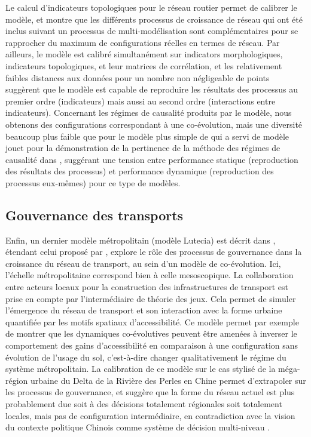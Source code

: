 \documentclass[11pt]{article}
\begin{document}
Le calcul d'indicateurs topologiques pour le réseau routier permet de calibrer le modèle, et \cite{raimbault2018multi} montre que les différents processus de croissance de réseau qui ont été inclus suivant un processus de multi-modélisation sont complémentaires pour se rapprocher du maximum de configurations réelles en termes de réseau. Par ailleurs, le modèle est calibré simultanément sur indicators morphologiques, indicateurs topologiques, et leur matrices de corrélation, et les relativement faibles distances aux données pour un nombre non négligeable de points suggèrent que le modèle est capable de reproduire les résultats des processus au premier ordre (indicateurs) mais aussi au second ordre (interactions entre indicateurs). Concernant les régimes de causalité produits par le modèle, nous obtenons des configurations correspondant à une co-évolution, mais une diversité beaucoup plus faible que pour le modèle plus simple de \cite{raimbault2014hybrid} qui a servi de modèle jouet pour la démonstration de la pertinence de la méthode des régimes de causalité dans \cite{raimbault2017identification}, suggérant une tension entre performance statique (reproduction des résultats des processus) et performance dynamique (reproduction des processus eux-mêmes) pour ce type de modèles.
 

\subsection{Gouvernance des transports}
 
Enfin, un dernier modèle métropolitain (modèle Lutecia) est décrit dans \cite{raimbault2018caracterisation}, étendant celui proposé par \citep{lenechet:halshs-01272236}, explore le rôle des processus de gouvernance dans la croissance du réseau de transport, au sein d'un modèle de co-évolution. Ici, l'échelle métropolitaine correspond bien à celle mesoscopique. La collaboration entre acteurs locaux pour la construction des infrastructures de transport est prise en compte par l'intermédiaire de théorie des jeux. Cela permet de simuler l'émergence du réseau de transport et son interaction avec la forme urbaine quantifiée par les motifs spatiaux d'accessibilité. Ce modèle permet par exemple de montrer que les dynamiques co-évolutives peuvent être amenées à inverser le comportement des gains d'accessibilité en comparaison à une configuration sans évolution de l'usage du sol, c'est-à-dire changer qualitativement le régime du système métropolitain. La calibration de ce modèle sur le cas stylisé de la méga-région urbaine du Delta de la Rivière des Perles en Chine permet d'extrapoler sur les processus de gouvernance, et suggère que la forme du réseau actuel est plus probablement due soit à des décisions totalement régionales soit totalement locales, mais pas de configuration intermédiaire, en contradiction avec la vision du contexte politique Chinois comme système de décision multi-niveau \citep{liao2017ouverture}.
\end{document}
